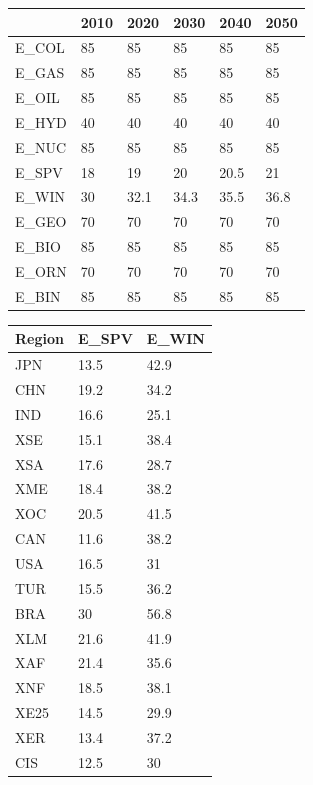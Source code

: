 \documentclass[10pt,a4paper,titlepage,dvipdfmx]{book}
\begin{document}
\begin{itemize}
\begin{tabularx}{\textwidth}{|
p{}|
p{}|
p{}|
p{}|
p{}|
p{}|} 
\caption{\label{tab:CapFac}Capacity factor (\%)}\\
\hline 
  & 2010 & 2020 & 2030 & 2040 & 2050 \\\hline 
E\_COL & 85 & 85 & 85 & 85 & 85 \\\hline 
E\_GAS & 85 & 85 & 85 & 85 & 85 \\\hline 
E\_OIL & 85 & 85 & 85 & 85 & 85 \\\hline 
E\_HYD & 40 & 40 & 40 & 40 & 40 \\\hline 
E\_NUC & 85 & 85 & 85 & 85 & 85 \\\hline 
E\_SPV & 18 & 19 & 20 & 20.5 & 21 \\\hline 
E\_WIN & 30 & 32.1 & 34.3 & 35.5 & 36.8 \\\hline 
E\_GEO & 70 & 70 & 70 & 70 & 70 \\\hline 
E\_BIO & 85 & 85 & 85 & 85 & 85 \\\hline 
E\_ORN & 70 & 70 & 70 & 70 & 70 \\\hline 
E\_BIN & 85 & 85 & 85 & 85 & 85 \\\hline 
\end{tabularx}

\begin{tabularx}{\textwidth}{|
p{}|
p{}|
p{}|} 
\caption{\label{tab:CapFacReg}Capacity factors for VRE by regions (\%)}\\
\hline 
Region & E\_SPV & E\_WIN \\\hline 
JPN & 13.5 & 42.9 \\\hline
CHN & 19.2 & 34.2 \\\hline
IND & 16.6 & 25.1 \\\hline
XSE & 15.1 & 38.4 \\\hline
XSA & 17.6 & 28.7 \\\hline
XME & 18.4 & 38.2 \\\hline
XOC & 20.5 & 41.5 \\\hline
CAN & 11.6 & 38.2 \\\hline
USA & 16.5 & 31 \\\hline
TUR & 15.5 & 36.2 \\\hline
BRA & 30 & 56.8 \\\hline
XLM & 21.6 & 41.9 \\\hline
XAF & 21.4 & 35.6 \\\hline
XNF & 18.5 & 38.1 \\\hline
XE25 & 14.5 & 29.9 \\\hline
XER & 13.4 & 37.2 \\\hline
CIS & 12.5 & 30 \\\hline
\end{tabularx}



\end{itemize}
\end{document}
